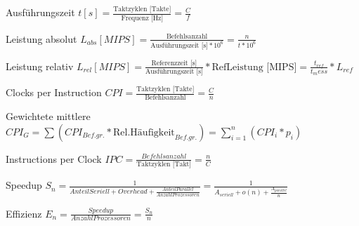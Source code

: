 \documentclass[a4paper]{article}
\begin{document}
\begin{multicols}{2}
  \footnotesize
  \begin{description*}
    \item[Ausführungszeit] $t[s]=\frac{\text{Taktzyklen [Takte]}}{\text{Frequenz [Hz]}} =\frac{C}{f}$
    \item[Leistung absolut] $L_{abs}[MIPS]=\frac{\text{Befehlsanzahl}}{\text{Ausführungszeit [s]}*10^6}=\frac{n}{t*10^6}$
    \item[Leistung relativ] $L_{rel}[MIPS]=\frac{\text{Referenzzeit [s]}}{\text{Ausführungszeit [s]}}*\text{RefLeistung [MIPS]} = \frac{t_{ref}}{t_mess}*L_{ref}$
    \item[Clocks per Instruction] $CPI=\frac{\text{Taktzyklen [Takte]}}{\text{Befehlsanzahl}} =\frac{C}{n}$
    \item[Gewichtete mittlere] $CPI_{G}=\sum (CPI_{Bef.gr.}*\text{Rel.Häufigkeit}_{Bef.gr.})=\sum_{i=1}^n(CPI_i*p_i)$
    \item[Instructions per Clock] $IPC=\frac{Befehlsanzahl}{\text{Taktzyklen [Takt]}}=\frac{n}{C}$
    \item[Speedup] $S_n=\frac{1}{AnteilSeriell + Overhead + \frac{AnteilParallel}{AnzahlProzessoren}}=\frac{1}{ A_{seriell} + o(n) + \frac{ A_{parallel} }{ n }}$
    \item[Effizienz] $E_n=\frac{Speedup}{AnzahlProzessoren}=\frac{S_n}{n}$
  \end{description*}
\end{multicols}

\end{document}
